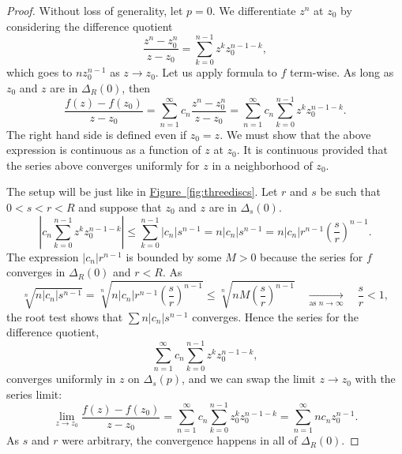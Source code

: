 \documentclass[12pt,openany]{book}
\newcommand{\sabs}[1]{\lvert {#1} \rvert}
\newcommand{\abs}[1]{\left\lvert {#1} \right\rvert}
\theoremstyle{plain}
\theoremstyle{remark}
\theoremstyle{definition}
\theoremstyle{exercise}
\theoremstyle{example}
\newcommand{\figureref}[1]{\hyperref[#1]{Figure~\ref*{#1}}}
\begin{document}
\begin{proof}
Without loss of generality, let $p=0$.
We differentiate $z^n$ at $z_0$ by considering the difference
quotient
\begin{equation*}
\frac{z^n-z_0^n}{z-z_0}
=
\sum_{k=0}^{n-1}
z^k z_0^{n-1-k} ,
\end{equation*}
which goes to $n z_0^{n-1}$ as $z \to z_0$.
Let us apply formula to $f$
term-wise.  As long as $z_0$ and $z$ are in $\Delta_R(0)$, then
\begin{equation*}
\frac{f(z) - f(z_0)}{z-z_0}
=
\sum_{n=1}^\infty c_n \frac{z^n-z_0^n}{z-z_0}
=
\sum_{n=1}^\infty c_n \sum_{k=0}^{n-1} z^k z_0^{n-1-k} .
\end{equation*}
The right hand side is defined even if $z_0 = z$.
We must show that the above expression is continuous as a function of $z$
at $z_0$.
It is continuous provided that the series above
converges uniformly for $z$ in a
neighborhood of $z_0$.

The setup will be just like in \figureref{fig:threediscs}.
Let $r$ and $s$ be such that $0 < s < r < R$ and suppose that $z_0$ and $z$ are
in $\Delta_s(0)$.
\begin{equation*}
\abs{c_n \sum_{k=0}^{n-1} z^k z_0^{n-1-k}}
\leq
\sum_{k=0}^{n-1} 
\sabs{c_n} s^{n-1}
=
n
\sabs{c_n} s^{n-1}
=
n
\sabs{c_n} r^{n-1} {\left(\frac{s}{r}\right)}^{n-1} .
\end{equation*}
The expression
$\sabs{c_n} r^{n-1}$ is bounded by some $M > 0$ because the series for $f$ converges
in $\Delta_R(0)$ and $r < R$.
As
\begin{equation*}
\sqrt[n]{
n \sabs{c_n} s^{n-1}
}
=
\sqrt[n]{
n \sabs{c_n} r^{n-1} {\left(\frac{s}{r}\right)}^{n-1}
}
\leq
\sqrt[n]{
n M {\left(\frac{s}{r}\right)}^{n-1}
}
\quad\underset{\text{as } n \to \infty}{\to}\quad
\frac{s}{r} < 1 ,
\end{equation*}
the root test shows that
$\sum n \sabs{c_n} s^{n-1}$
converges.
Hence the series for the difference quotient,
\begin{equation*}
\sum_{n=1}^\infty c_n \sum_{k=0}^{n-1} z^k z_0^{n-1-k} ,
\end{equation*}
converges uniformly in $z$ on $\Delta_s(p)$, and
we can swap the limit $z \to z_0$ with the series limit:
\begin{equation*}
\lim_{z \to z_0}
\frac{f(z)-f(z_0)}{z-z_0}
=
\sum_{n=1}^\infty c_n \sum_{k=0}^{n-1} z_0^k z_0^{n-1-k}
=
\sum_{n=1}^\infty n c_n z_0^{n-1} .
\end{equation*}
As $s$ and $r$ were arbitrary, the convergence happens in all of
$\Delta_R(0)$.
\end{proof}
\end{document}

